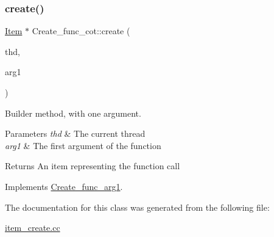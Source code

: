 \subsubsection{\texorpdfstring{create()}{create()}}
{\footnotesize\ttfamily \mbox{\hyperlink{classItem}{Item}} $\ast$ Create\+\_\+func\+\_\+cot\+::create (\begin{DoxyParamCaption}\item[{T\+HD $\ast$}]{thd,  }\item[{\mbox{\hyperlink{classItem}{Item}} $\ast$}]{arg1 }\end{DoxyParamCaption})\hspace{0.3cm}{\ttfamily [virtual]}}

Builder method, with one argument. 
\begin{DoxyParams}{Parameters}
{\em thd} & The current thread \\
\hline
{\em arg1} & The first argument of the function \\
\hline
\end{DoxyParams}
\begin{DoxyReturn}{Returns}
An item representing the function call 
\end{DoxyReturn}


Implements \mbox{\hyperlink{classCreate__func__arg1_a3e9a98f755cd82c3e762e334c955a8c9}{Create\+\_\+func\+\_\+arg1}}.



The documentation for this class was generated from the following file\+:\begin{DoxyCompactItemize}
\item 
\mbox{\hyperlink{item__create_8cc}{item\+\_\+create.\+cc}}\end{DoxyCompactItemize}
